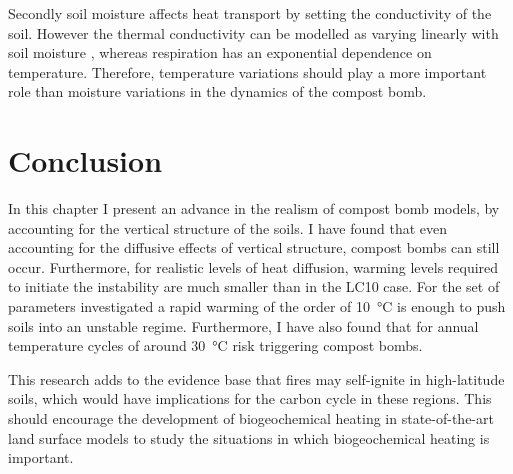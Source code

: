 Secondly soil moisture affects heat transport by setting the conductivity of the soil. However the thermal conductivity can be
modelled as varying linearly with soil moisture \parencite{Best2011}, whereas respiration has an exponential dependence on temperature. Therefore, temperature variations
should play a more important role than moisture variations in the dynamics of the compost bomb.


\section{Conclusion}
\label{sec:conclusion}
In this chapter I present an advance in the realism of compost bomb models, by accounting for the vertical structure of the soils. I have found that even accounting
for the diffusive effects of vertical structure, compost bombs can still occur. Furthermore, for realistic levels of heat diffusion,
warming levels required to initiate the instability are much smaller than in the LC10 case. For the set of parameters investigated a rapid warming of the order of \SI{10}{\degreeCelsius} is
enough to push soils into an unstable regime. Furthermore, I have also found that for annual temperature cycles of around \SI{30}{\degreeCelsius} risk triggering compost bombs.

This research adds to the evidence base that fires may self-ignite in high-latitude soils, which would have implications for the carbon cycle in these regions.
This should encourage the development of biogeochemical heating in state-of-the-art land surface models to study the situations in which biogeochemical heating is important.

